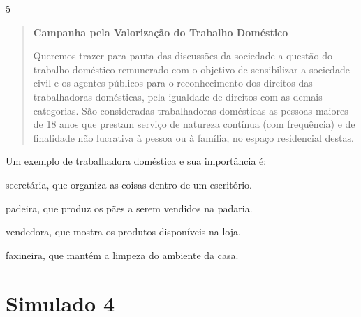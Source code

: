 \num{5}

\begin{quote}
\textbf{Campanha pela Valorização do Trabalho Doméstico}

Queremos trazer para pauta das discussões da sociedade a questão do
trabalho doméstico remunerado com o objetivo de sensibilizar a sociedade
civil e os agentes públicos para o reconhecimento dos direitos das
trabalhadoras domésticas, pela igualdade de direitos com as demais
categorias. São consideradas trabalhadoras domésticas as pessoas maiores
de 18 anos que prestam serviço de natureza contínua (com frequência) e
de finalidade não lucrativa à pessoa ou à família, no espaço residencial
destas.

\end{quote}

Um exemplo de trabalhadora doméstica e sua importância é:

\begin{escolha}
\item secretária, que organiza as coisas dentro de um escritório.

\item padeira, que produz os pães a serem vendidos na padaria.

\item vendedora, que mostra os produtos disponíveis na loja.

\item faxineira, que mantém a limpeza do ambiente da casa.
\end{escolha}


\chapter{Simulado 4}

